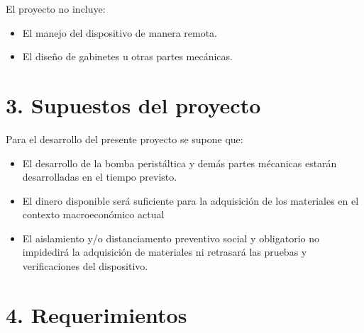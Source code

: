 \documentclass[11pt]{charter}
\begin{document}
El proyecto no incluye:
\begin{itemize}
\item El manejo del dispositivo de manera remota.
\item El diseño de gabinetes u otras partes mecánicas. 
\end{itemize}

\section{3. Supuestos del proyecto}
\label{sec:supuestos}

Para el desarrollo del presente proyecto se supone que:

\begin{itemize}
\item El desarrollo de la bomba peristáltica y demás partes mécanicas estarán desarrolladas en el tiempo previsto.
\item El dinero disponible será suficiente para la adquisición de los materiales en el contexto macroeconómico actual
\item El aislamiento y/o distanciamento preventivo social y obligatorio no impidedirá la adquisición de materiales ni retrasará las pruebas y verificaciones del dispositivo.
\end{itemize}

\section{4. Requerimientos} %
\label{sec:requerimientos}
\end{document}
